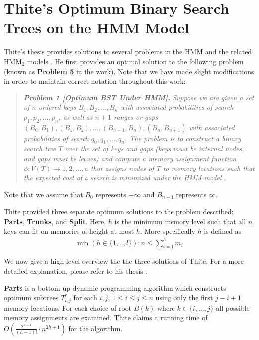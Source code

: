 \documentclass[letterpaper,12pt,titlepage,oneside,final]{book}
\theoremstyle{plain}
\begin{document}
\section{Thite's Optimum Binary Search Trees on the HMM Model}

Thite's thesis provides solutions to several problems in the HMM and the related HMM$_2$ models \cite{thite2008optimum}. He first provides an optimal solution to the following problem (known as \textbf{Problem 5} in the work). Note that we have made slight modifications in order to maintain correct notation throughout this work:

\begin{quote}
\noindent \textit{\textbf{Problem 1 [Optimum BST Under HMM].} Suppose we are given a set of $n$ ordered keys $B_1, B_2, ..., B_n$ with associated probabilities of search $p_1, p_2, ..., p_n$, as well as $n+1$ ranges or gaps $(B_0, B_1), (B_1, B_2), ..., (B_{n-1}, B_n), (B_n, B_{n+1})$ with associated probabilities of search $q_0, q_1, ..., q_n$. The problem is to construct a binary search tree $T$ over the set of keys and gaps (keys must be internal nodes, and gaps must be leaves) and compute a memory assignment function $\phi : V (T) \rightarrow {1, 2, ..., n}$ that assigns nodes of $T$ to memory locations such that the expected cost of a search is minimized under the HMM model} \cite{thite2008optimum}.
\end{quote}

\noindent Note that we assume that $B_0$ represents $- \infty$ and $B_{n+1}$ represents $\infty$.

Thite provided three separate optimum solutions to the problem described; \textbf{Parts}, \textbf{Trunks}, and \textbf{Split}. Here, $h$ is the minimum memory level such that all $n$ keys can fit on memories of height at most $h$. More specifically $h$ is defined as \\
\begin{align*}
\min(h \in \{1,..,l\} ): n \leq \sum_{i = 1}^{h}m_i
\end{align*}

\noindent We now give a high-level overview the the three solutions of Thite. For a more detailed explanation, please refer to his thesis \cite{thite2008optimum}.

\textbf{Parts} is a bottom up dynamic programming algorithm which constructs optimum subtrees $T^{*}_{i,j}$ for each $i,j$, $1 \leq i \leq j \leq n$ using only the first $j-i+1$ memory locations. For each choice of root $B(k)$ where $k \in \{i, ..., j\}$ all possible memory assignments are examined. Thite claims a running time of $O(\frac{2^{h-1}}{(h-1)!}\cdot n^{2h+1})$ for the algorithm.
\end{document}

